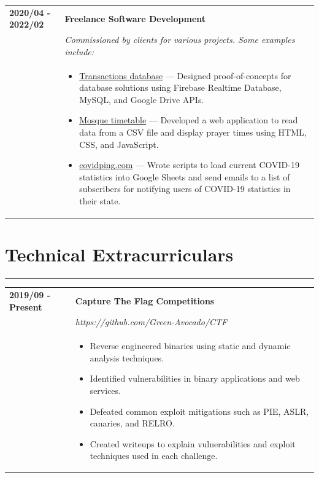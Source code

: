 \documentclass[letterpaper]{article}
\newcommand{\sectcolor}{cyan}
\newcommand{\sect}[1]{\section*{#1}
                        {\color{\sectcolor}
                        \rule{\textwidth}{1pt}
                        \vspace{-7pt}}}
\begin{document}
        \begin{tabular}{p{} p{}}
            \textbf{2020/04 - 2022/02} & \textbf{Freelance Software Development} \\
            & \emph{Commissioned by clients for various projects. Some examples include:} \\
            & \begin{itemize}
                \item \underline{Transactions database} ---
                    Designed proof-of-concepts for database solutions using Firebase Realtime Database,
                    MySQL, and Google Drive APIs.
                \item \underline{Mosque timetable} ---
                    Developed a web application to read data from a CSV file and display prayer times
                    using HTML, CSS, and JavaScript.
                \item \underline{covidping.com} ---
                    Wrote scripts to load current COVID-19 statistics into Google Sheets and send emails
                    to a list of subscribers for notifying users of COVID-19 statistics in their state.
            \end{itemize}
        \end{tabular}

    \sect{Technical Extracurriculars}

        \begin{tabular}{p{} p{}}
            \textbf{2019/09 - Present} & \textbf{Capture The Flag Competitions} \\
            & \emph{https://github.com/Green-Avocado/CTF} \\
            & \begin{itemize}
                \item Reverse engineered binaries using static and dynamic analysis techniques.
                \item Identified vulnerabilities in binary applications and web services.
                \item Defeated common exploit mitigations such as PIE, ASLR, canaries, and RELRO.
                \item Created writeups to explain vulnerabilities and exploit techniques used in each
                    challenge.
            \end{itemize}
        \end{tabular}
\end{document}
